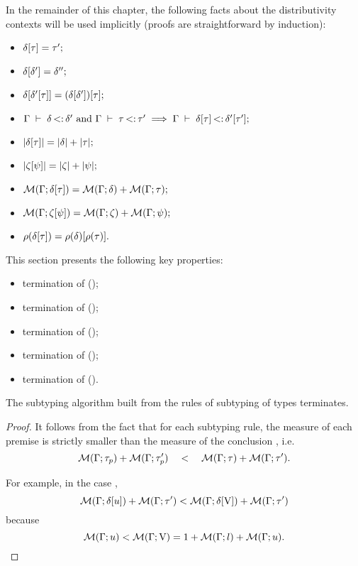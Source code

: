 In the remainder of this chapter, the following facts about
the distributivity contexts
will be used implicitly (proofs are straightforward by induction):
\begin{itemize}
    \item $\delta[\tau] = \tau';$
    \item $\delta[\delta'] = \delta'';$
    \item $\delta[\delta'[\tau]] = 
        (\delta[\delta'])[\tau];$
    \item $\Gamma\;\vdash\;\delta \operatorname{<:} \delta' \text{ and } \Gamma\;\vdash\;\tau \operatorname{<:} \tau'
        \implies \Gamma\;\vdash\;\delta[\tau] \operatorname{<:} \delta'[\tau'];$
    \item $|\delta[\tau]| = |\delta| + |\tau|;$
    \item $|\zeta[\psi]| = |\zeta| + |\psi|;$
    \item $\operatorname{\mathcal{M}}(\Gamma;\delta[\tau]) = \operatorname{\mathcal{M}}(\Gamma;\delta) + \operatorname{\mathcal{M}}(\Gamma;\tau);$
    \item $\operatorname{\mathcal{M}}(\Gamma;\zeta[\psi]) = 
        \operatorname{\mathcal{M}}(\Gamma;\zeta) + \operatorname{\mathcal{M}}(\Gamma;\psi);$
    \item $\rho(\delta[\tau]) = 
        \rho(\delta)[\rho(\tau)].$    
\end{itemize}

This section presents the following key properties:
\begin{itemize}
    \item termination of  ();
    \item termination of  ();
    \item termination of  ();
    \item termination of \solvectrdflt ();
    \item termination of  ().
\end{itemize}

\begin{theorem}%
\label{thm:subty-terminates}
    The subtyping algorithm built from the rules of subtyping of types
     terminates.
\end{theorem}
\begin{proof}
    It follows from the fact that for each subtyping rule, 
    the measure of each premise 
    is strictly smaller than the measure 
    of the conclusion , i.e.
    \[\operatorname{\mathcal{M}}(\Gamma;\tau_p) + \operatorname{\mathcal{M}}(\Gamma;\tau'_p) \quad<\quad 
    \operatorname{\mathcal{M}}(\Gamma;\tau) + \operatorname{\mathcal{M}}(\Gamma;\tau').\]

    For example, in the case ,
    \[\operatorname{\mathcal{M}}(\Gamma;\delta[u]) + \operatorname{\mathcal{M}}(\Gamma;\tau') < 
    \operatorname{\mathcal{M}}(\Gamma;\delta[\mathrm{V}]) + \operatorname{\mathcal{M}}(\Gamma;\tau')\]
    because \[\operatorname{\mathcal{M}}(\Gamma;u) < \operatorname{\mathcal{M}}(\Gamma;\mathrm{V}) = 
        1 + \operatorname{\mathcal{M}}(\Gamma;l) + \operatorname{\mathcal{M}}(\Gamma;u).\]
\end{proof}

